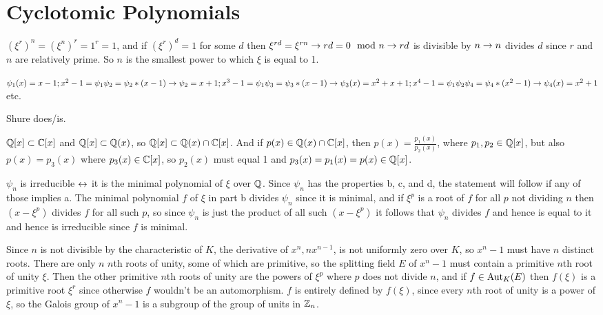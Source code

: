 \documentclass[11pt, oneside]{article}   	%
\begin{document}
\section{Cyclotomic Polynomials}
\be
\item $(\xi^r)^n = (\xi^n)^r = 1^r = 1$, and if $(\xi^r)^d = 1$ for some $d$ then $\xi^{rd} = \xi^{rn} \rightarrow rd = 0 \mod n \rightarrow rd$ is divisible by $n \rightarrow n$ divides $d$ since $r$ and $n$ are relatively prime. So $n$ is the smallest power to which $\xi$ is equal to 1.
\item $\psi_1(x) = x-1; x^2 - 1 = \psi_1\psi_2 = \psi_2 * (x-1) \rightarrow \psi_2 = x + 1; x^3 - 1 = \psi_1\psi_3 = \psi_3 * (x-1) \rightarrow \psi_3(x) = x^2 + x + 1; x^4  - 1 = \psi_1\psi_2\psi_4 = \psi_4*(x^2 - 1) \rightarrow \psi_4(x) = x^2 + 1$ etc.
\item Shure does/is.
\item $\mathbb{Q}[x] \subset \mathbb{C}[x]$ and $\mathbb{Q}[x] \subset \mathbb{Q}(x)$, so $\mathbb{Q}[x] \subset \mathbb{Q}(x) \cap \mathbb{C}[x]$. And if $p(x) \in \mathbb{Q}(x) \cap \mathbb{C}[x]$, then $p(x) = \frac{p_1(x)}{p_2(x)}$, where $p_1, p_2 \in \mathbb{Q}[x]$, but also $p(x) = p_3(x)$ where $p_3(x) \in \mathbb{C}[x]$, so $p_2(x)$ must equal 1 and $p_3(x) = p_1(x) = p(x) \in \mathbb{Q}[x]$.
\item $\psi_n$ is irreducible $\leftrightarrow$ it is the minimal polynomial of $\xi$ over $\mathbb{Q}$. Since $\psi_n$ has the properties b, c, and d, the statement will follow if any of those implies a. The minimal polynomial $f$ of $\xi$ in part b divides $\psi_n$ since it is minimal, and if $\xi^p$ is a root of $f$ for all $p$ not dividing $n$ then $(x - \xi^p)$ divides $f$ for all such $p$, so since $\psi_n$ is just the product of all such $(x-\xi^p)$ it follows that $\psi_n$ divides $f$ and hence is equal to it and hence is irreducible since $f$ is minimal.
\item Since $n$ is not divisible by the characteristic of $K$, the derivative of $x^n, nx^{n-1}$, is not uniformly zero over $K$, so $x^n-1$ must have $n$ distinct roots. There are only $n$ $n$th roots of unity, some of which are primitive, so the splitting field $E$ of $x^n-1$ must contain a primitive $n$th root of unity $\xi$. Then the other primitive $n$th roots of unity are the powers of $\xi^p$ where $p$ does not divide $n$, and if $f \in \text{Aut}_K(E)$ then $f(\xi)$ is a primitive root $\xi^r$ since otherwise $f$ wouldn't be an automorphism. $f$ is entirely defined by $f(\xi)$, since every $n$th root of unity is a power of $\xi$, so the Galois group of $x^n-1$ is a subgroup of the group of units in $\mathbb{Z}_n$. 
\ee
\end{document}
